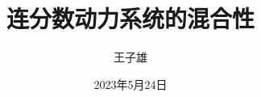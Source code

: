 \title{连分数动力系统的混合性} %
\def\school{} %
\def\classnum{} %
\author{王子雄} %
\def\stunum{}	%
\def\instructor{} %
\date{2023年5月24日} %